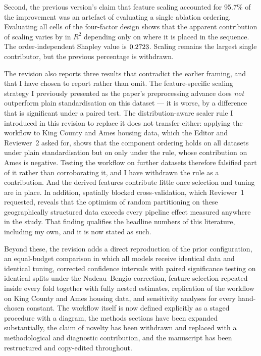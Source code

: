 \documentclass[11pt,a4paper]{article}
\begin{document}
Second, the previous version's claim that feature scaling accounted for 95.7\% of the
improvement was an artefact of evaluating a single ablation ordering. Evaluating all
\AblNcells{} cells of the four-factor design shows that the apparent contribution of scaling
varies by \RangeScal{} in $R^2$ depending only on where it is placed in the sequence. The
order-independent Shapley value is $0.2723$. Scaling remains the largest single
contributor, but the previous percentage is withdrawn.

The revision also reports three results that contradict the earlier framing, and that I have
chosen to report rather than omit. The feature-specific scaling strategy I previously
presented as the paper's preprocessing advance does \emph{not} outperform plain
standardisation on this dataset --- it is worse, by a difference that is significant under a
paired test. The distribution-aware scaler rule I introduced in this revision to replace it
does not transfer either: applying the workflow to King County and Ames housing data, which
the Editor and Reviewer~2 asked for, shows that the component ordering holds on all
\NOrderHoldsUni{} datasets under plain standardisation but on only \NOrderHoldsAuto{} under
the rule, whose contribution on Ames is negative. Testing the workflow on further datasets
therefore falsified part of it rather than corroborating it, and I have withdrawn the rule as
a contribution. And the derived features contribute little once selection and tuning are in
place. In addition, spatially blocked cross-validation, which Reviewer~1 requested, reveals
that the optimism of random partitioning on these geographically structured data exceeds
every pipeline effect measured anywhere in the study. That finding qualifies the headline
numbers of this literature, including my own, and it is now stated as such.

Beyond these, the revision adds a direct reproduction of the prior configuration, an
equal-budget comparison in which all \NModels{} models receive identical data and identical
tuning, corrected confidence intervals with paired significance testing on identical splits
under the Nadeau--Bengio correction, feature selection repeated inside every fold together
with fully nested estimates, replication of the workflow on King County and Ames housing
data, and sensitivity analyses for every hand-chosen constant. The workflow itself is now
defined explicitly as a staged procedure with a diagram, the methods sections have been
expanded substantially, the claim of novelty has been withdrawn and replaced with a
methodological and diagnostic contribution, and the manuscript has been restructured and
copy-edited throughout.
\end{document}
